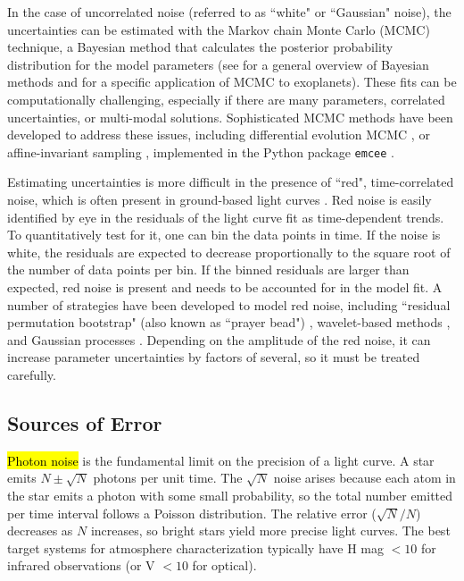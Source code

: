 \documentclass[graybox,natbib,nosecnum]{svmult}
\newcommand{\hbindex}[1]{\hl{#1}\index{#1}}  %
\begin{document}
In the case of uncorrelated noise (referred to as ``white" or ``Gaussian" noise), the uncertainties can be estimated with the Markov chain Monte Carlo (MCMC) technique, a Bayesian method that calculates the posterior probability distribution for the model parameters (see \citealt{sivia96} for a general overview of Bayesian methods and \citealt{ford05} for a specific application of MCMC to exoplanets). These fits can be computationally challenging, especially if there are many parameters, correlated uncertainties, or multi-modal solutions. Sophisticated MCMC methods have been developed to address these issues, including differential evolution MCMC \citep{braak06}, or affine-invariant sampling \citep{goodman10}, implemented in the Python package \texttt{emcee} \citep{foremanmackey13}.

Estimating uncertainties is more difficult in the presence of ``red", time-correlated noise, which is often present in ground-based light curves \citep{}. Red noise is easily identified by eye in the residuals of the light curve fit as time-dependent trends. To quantitatively test for it, one can bin the data points in time. If the noise is white, the residuals are expected to decrease proportionally to the square root of the number of data points per bin. If the binned residuals are larger than expected, red noise is present and needs to be accounted for in the model fit.  A number of strategies have been developed to model red noise, including ``residual permutation bootstrap" (also known as ``prayer bead")  \citep{southworth08}, wavelet-based methods \citep{carter09}, and Gaussian processes \citep{rasmussen05}. Depending on the amplitude of the red noise, it can increase parameter uncertainties by factors of several, so it must be treated carefully.

\subsection{Sources of Error}

\hbindex{Photon noise} is the fundamental limit on the precision of a light curve. A star emits $N \pm \sqrt{N}$ photons per unit time. The $\sqrt{N}$ noise arises because each atom in the star emits a photon with some small probability, so the total number emitted per time interval follows a Poisson distribution. The relative error ($\sqrt{N}/N$) decreases as $N$ increases, so bright stars yield more precise light curves.  The best target systems for atmosphere characterization typically have H mag $< 10$ for infrared observations (or V $< 10$ for optical).  
\end{document}
